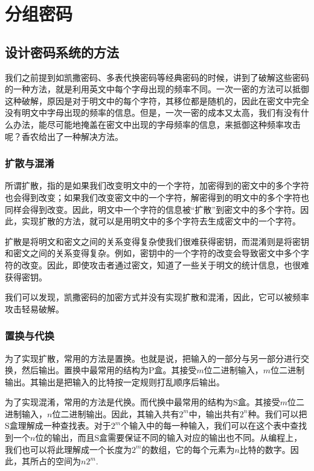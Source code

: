 \chapter{分组密码}
\section{设计密码系统的方法}
我们之前提到如凯撒密码、多表代换密码等经典密码的时候，讲到了破解这些密码的一种方法，就是利用英文中每个字母出现的频率不同。一次一密的方法可以抵御这种破解，原因是对于明文中的每个字符，其移位都是随机的，因此在密文中完全没有明文中字母出现的频率的信息。但是，一次一密的成本又太高，我们有没有什么办法，能尽可能地掩盖在密文中出现的字母频率的信息，来抵御这种频率攻击呢？香农给出了一种解决方法。
\subsection{扩散与混淆}
所谓扩散，指的是如果我们改变明文中的一个字符，加密得到的密文中的多个字符也会得到改变；如果我们改变密文中的一个字符，解密得到的明文中的多个字符也同样会得到改变。因此，明文中一个字符的信息被“扩散”到密文中的多个字符。因此，实现扩散的方法，就可以是用明文中的多个字符去生成密文中的一个字符。\par
扩散是将明文和密文之间的关系变得复杂使我们很难获得密钥，而混淆则是将密钥和密文之间的关系变得复杂。例如，密钥中的一个字符的改变会导致密文中多个字符的改变。因此，即使攻击者通过密文，知道了一些关于明文的统计信息，也很难获得密钥。\par
我们可以发现，凯撒密码的加密方式并没有实现扩散和混淆，因此，它可以被频率攻击轻易破解。
\subsection{置换与代换}
为了实现扩散，常用的方法是置换。也就是说，把输入的一部分与另一部分进行交换，然后输出。置换中最常用的结构为P盒。其接受$m$位二进制输入，$m$位二进制输出。其输出是把输入的比特按一定规则打乱顺序后输出。\par
为了实现混淆，常用的方法是代换。而代换中最常用的结构为S盒。其接受$m$位二进制输入，$n$位二进制输出。因此，其输入共有$2^m$中，输出共有$2^n$种。我们可以把S盒理解成一种查找表。对于$2^m$个输入中的每一种输入，我们可以在这个表中查找到一个$n$位的输出，而且S盒需要保证不同的输入对应的输出也不同。从编程上，我们也可以将此理解成一个长度为$2^m$的数组，它的每个元素为$n$比特的数字。因此，其所占的空间为$n2^m$.

